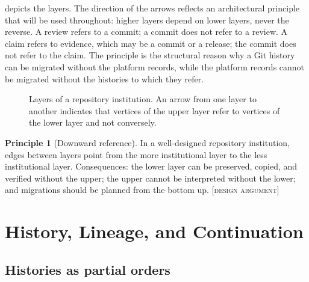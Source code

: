 \documentclass[11pt,twoside,openright]{book}
\theoremstyle{plain}
\theoremstyle{definition}
\newtheorem{principle}[theorem]{Principle}
\theoremstyle{remark}
\newcommand{\Design}{\textup{\textsc{[design argument]}}}
\begin{document}
 depicts the layers. The direction of the arrows reflects an architectural principle that will be used throughout: higher layers depend on lower layers, never the reverse. A review refers to a commit; a commit does not refer to a review. A claim refers to evidence, which may be a commit or a release; the commit does not refer to the claim. The principle is the structural reason why a Git history can be migrated without the platform records, while the platform records cannot be migrated without the histories to which they refer.

\begin{figure}[t]
\centering
{}
\caption{Layers of a repository institution. An arrow from one layer to another indicates that vertices of the upper layer refer to vertices of the lower layer and not conversely.}
\label{fig:layers}
\end{figure}

\begin{principle}[Downward reference]\label{pr:downward}
In a well-designed repository institution, edges between layers point from the more institutional layer to the less institutional layer. Consequences: the lower layer can be preserved, copied, and verified without the upper; the upper cannot be interpreted without the lower; and migrations should be planned from the bottom up.
\Design{}
\end{principle}

\chapter{History, Lineage, and Continuation}\label{ch:lineage}

\section{Histories as partial orders}
\end{document}
